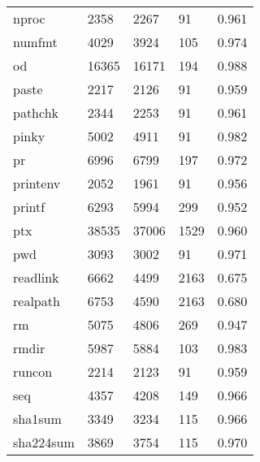 \begin{longtable}{lp{3.0cm}p{3.0cm}p{3.0cm}p{3.0cm}}
nproc     &                     2358 &         2267 &            91 &                    0.961 \\
numfmt    &                     4029 &         3924 &           105 &                    0.974 \\
od        &                    16365 &        16171 &           194 &                    0.988 \\
paste     &                     2217 &         2126 &            91 &                    0.959 \\
pathchk   &                     2344 &         2253 &            91 &                    0.961 \\
pinky     &                     5002 &         4911 &            91 &                    0.982 \\
pr        &                     6996 &         6799 &           197 &                    0.972 \\
printenv  &                     2052 &         1961 &            91 &                    0.956 \\
printf    &                     6293 &         5994 &           299 &                    0.952 \\
ptx       &                    38535 &        37006 &          1529 &                    0.960 \\
pwd       &                     3093 &         3002 &            91 &                    0.971 \\
readlink  &                     6662 &         4499 &          2163 &                    0.675 \\
realpath  &                     6753 &         4590 &          2163 &                    0.680 \\
rm        &                     5075 &         4806 &           269 &                    0.947 \\
rmdir     &                     5987 &         5884 &           103 &                    0.983 \\
runcon    &                     2214 &         2123 &            91 &                    0.959 \\
seq       &                     4357 &         4208 &           149 &                    0.966 \\
sha1sum   &                     3349 &         3234 &           115 &                    0.966 \\
sha224sum &                     3869 &         3754 &           115 &                    0.970 \\

\end{longtable}
